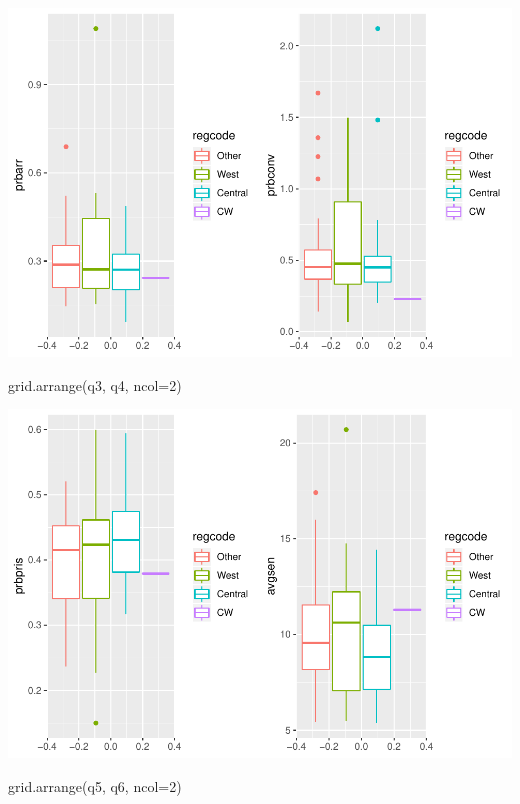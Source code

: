 \documentclass[]{article}
\newenvironment{Shaded}{}{}
\newcommand{\DataTypeTok}[1]{#1}
\newcommand{\DecValTok}[1]{#1}
\newcommand{\KeywordTok}[1]{\textcolor[rgb]{0.00,0.00,1.00}{#1}}
\newcommand{\NormalTok}[1]{#1}
\begin{document}
\includegraphics{Bagnard_Gaustad_Hartman_Leung_Lab_3_files/figure-latex/unnamed-chunk-22-1.pdf}

\begin{Shaded}
\begin{Highlighting}[]
\KeywordTok{grid.arrange}\NormalTok{(q3, q4, }\DataTypeTok{ncol=}\DecValTok{2}\NormalTok{)}
\end{Highlighting}
\end{Shaded}

\includegraphics{Bagnard_Gaustad_Hartman_Leung_Lab_3_files/figure-latex/unnamed-chunk-22-2.pdf}

\begin{Shaded}
\begin{Highlighting}[]
\KeywordTok{grid.arrange}\NormalTok{(q5, q6, }\DataTypeTok{ncol=}\DecValTok{2}\NormalTok{)}
\end{Highlighting}
\end{Shaded}
\end{document}
